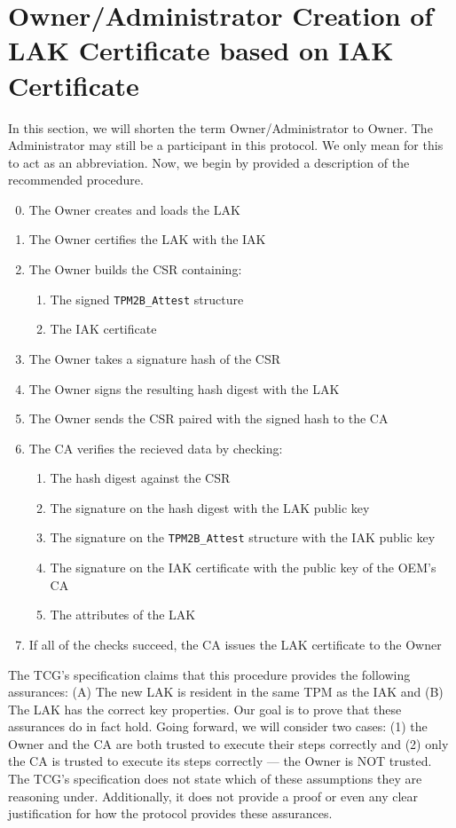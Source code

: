 \section{Owner/Administrator Creation of LAK Certificate based on IAK Certificate}
In this section, we will shorten the term Owner/Administrator to Owner. The Administrator may still be a participant in this protocol. We only mean for this to act as an abbreviation. Now, we begin by provided a description of the recommended procedure. 
\begin{enumerate}[itemsep=0pt,parsep=0pt,partopsep=0pt]
  \setcounter{enumi}{-1}
  \item The Owner creates and loads the LAK
  \item The Owner certifies the LAK with the IAK
  \item The Owner builds the CSR containing:
  \begin{enumerate}[topsep=0pt, itemsep=0pt,parsep=0pt,partopsep=0pt]
    \item The signed \verb|TPM2B_Attest| structure
    \item The IAK certificate
  \end{enumerate}
  \item The Owner takes a signature hash of the CSR
  \item The Owner signs the resulting hash digest with the LAK
  \item The Owner sends the CSR paired with the signed hash to the CA
  \item The CA verifies the recieved data by checking:
  \begin{enumerate}[topsep=0pt, itemsep=0pt,parsep=0pt,partopsep=0pt]
    \item The hash digest against the CSR
    \item The signature on the hash digest with the LAK public key
    \item The signature on the \verb|TPM2B_Attest| structure with the IAK public key
    \item The signature on the IAK certificate with the public key of the OEM's CA
    \item The attributes of the LAK
  \end{enumerate}
  \item If all of the checks succeed, the CA issues the LAK certificate to the Owner
\end{enumerate}
The TCG's specification claims that this procedure provides the following assurances: (A) The new LAK is resident in the same TPM as the IAK and (B) The LAK has the correct key properties. Our goal is to prove that these assurances do in fact hold. Going forward, we will consider two cases: (1) the Owner and the CA are both trusted to execute their steps correctly and (2) only the CA is trusted to execute its steps correctly --- the Owner is NOT trusted. The TCG's specification does not state which of these assumptions they are reasoning under. Additionally, it does not provide a proof or even any clear justification for how the protocol provides these assurances.

